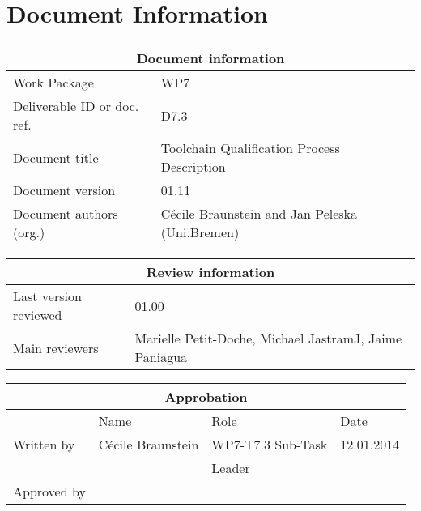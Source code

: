 \documentclass{template/openetcs_report}
\begin{document}
\newpage

\chapter{Document Information}

\begin{tabular}{|p{4.4cm}|p{8.7cm}|}
\hline
\multicolumn{2}{|c|}{Document information} \\
\hline
Work Package &  WP7  \\
Deliverable ID or doc. ref. & D7.3\\
\hline
Document title & Toolchain Qualification Process Description \\
Document version & 01.11 \\
Document authors (org.)  & Cécile Braunstein and Jan Peleska (Uni.Bremen) \\
\hline
\end{tabular}

\begin{tabular}{|p{4.4cm}|p{8.7cm}|}
\hline
\multicolumn{2}{|c|}{Review information} \\
\hline
Last version reviewed & 01.00 \\
\hline
Main reviewers &  Marielle Petit-Doche, Michael JastramJ, Jaime Paniagua\\
\hline
\end{tabular}

\begin{tabular}{|p{2.2cm}|p{4cm}|p{4cm}|p{2cm}|}
\hline
\multicolumn{4}{|c|}{Approbation} \\
\hline
  &  Name & Role & Date   \\
\hline  
Written by    &  Cécile Braunstein & WP7-T7.3 Sub-Task  & 12.01.2014 \\
&  & Leader&\\
\hline
Approved by &  &   &  \\
\hline
\end{tabular}
\end{document}
